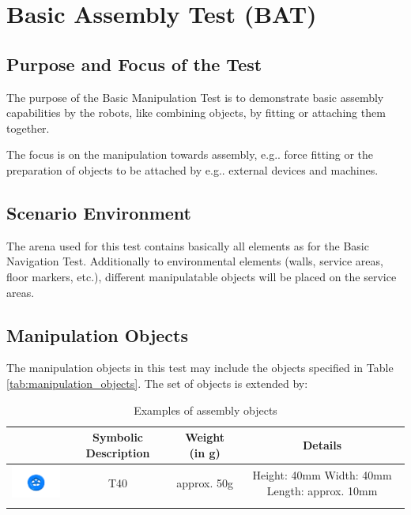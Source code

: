 \section{Basic Assembly Test (BAT)}

\subsection{Purpose and Focus of the Test}
The purpose of the Basic Manipulation Test is to demonstrate basic assembly capabilities by the robots, like combining objects, by fitting or attaching them together.
\par
The focus is on the manipulation towards assembly, e.g.. force fitting or the preparation of objects to be attached by e.g.. external devices and machines.

\subsection{Scenario Environment}
The arena used for this test contains basically all elements as for the Basic Navigation Test. Additionally to environmental elements (walls, service areas, floor markers, etc.), different manipulatable objects will be placed on the service areas. 

\subsection{Manipulation Objects}
The manipulation objects in this test may include the objects specified in Table \ref{tab:manipulation_objects}. The set of objects is extended by:

\begin{table}[p]
\begin{tabular}{|c|c|c|c|}
\hline 
 & Symbolic Description & Weight (in g) & Details \\ 
\hline 
\includegraphics[width=3cm]{../images/BAT_Tire.png}  & T40 & approx. 50g & Height: 40mm \newline
 Width: 40mm \newline
 Length: approx. 10mm \\ 
\hline 

\label{tab:bat_objects}
\end{tabular} 
\caption{Examples of assembly objects}
\end{table}

